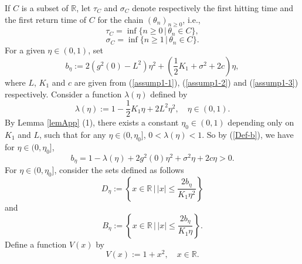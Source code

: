 \documentclass[11pt]{elsarticle}
\def\geq{\geqslant}
\def\leq{\leqslant}
\def\R{\mathbb{R}}
\begin{document}
If $C$ is a subset of $\R$, let $\tau_C$ and $\sigma_C$ denote respectively the first hitting time and the first return time of $C$ for the chain $(\theta_n)_{n\geq 0}$, i.e.,
$$\tau_C=\inf\{n\geq0\,\big|\,\theta_n\in C\},$$
$$\sigma_C=\inf\{n\geq1\,\big|\, \theta_n\in C\}.$$
For a given $\eta\in(0,1)$, set
\begin{equation}\label{Def-b}
	b_{\eta}:=2\left(g^2(0)-L^2\right)\eta^2+\left(\frac{1}{2}K_1+\sigma^2+2c\right)\eta,
\end{equation}
where $L$, $K_1$ and $c$ are given from (\ref{assump1-1}), (\ref{assump1-2}) and (\ref{assump1-3}) respectively. Consider a function $\lambda(\eta)$ defined by
$$\lambda(\eta):=1-\frac{1}{2}K_1\eta+2L^2\eta^2,\quad \eta\in(0,1).$$
By Lemma \ref{lemApp} (1), there exists a constant $\eta_0\in(0,1)$ depending only on $K_1$ and $L$, such that for any $\eta\in(0,\eta_0]$, $0<\lambda(\eta)<1$. So by (\ref{Def-b}), we have for $\eta\in(0,\eta_0]$,
\begin{equation}\label{b_eta}
	b_{\eta}=1-\lambda(\eta)+2g^2(0)\eta^2+\sigma^2\eta+2c\eta>0.
\end{equation}
For $\eta\in(0,\eta_0]$, consider the sets defined as follows
$$D_{\eta}:=\left\{x\in\R\,\Big|\,|x|\leq\frac{2b_{\eta}}{K_1\eta^2}\right\}$$
and 
$$B_{\eta}:=\left\{x\in\R\,\Big|\,|x|\leq\frac{2b_{\eta}}{K_1\eta}\right\}.$$
Define a function $V(x)$ by  
$$V(x):=1+x^2,\quad x\in\R.$$
\end{document}
